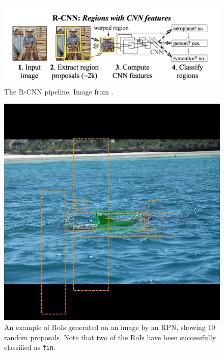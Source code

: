 \begin{figure}
	\begin{center}
		\includegraphics[scale=0.4]{Chapter2/figs/r-cnn.png}
	\end{center}
	\caption{The R-CNN pipeline. Image from \cite{girshick_rich_2014}.}
	\label{fig:r-cnn}
\end{figure}

\begin{figure}
	\begin{center}
		\includegraphics[scale=0.45]{Chapter2/figs/rpn-ten-random-orange.png}
	\end{center}
	\caption{An example of RoIs generated on an image by an RPN, showing 10 random proposals. Note that two of the RoIs have been successfully classified as \texttt{fin}.}
	\label{fig:rpn-randoms}
\end{figure}

